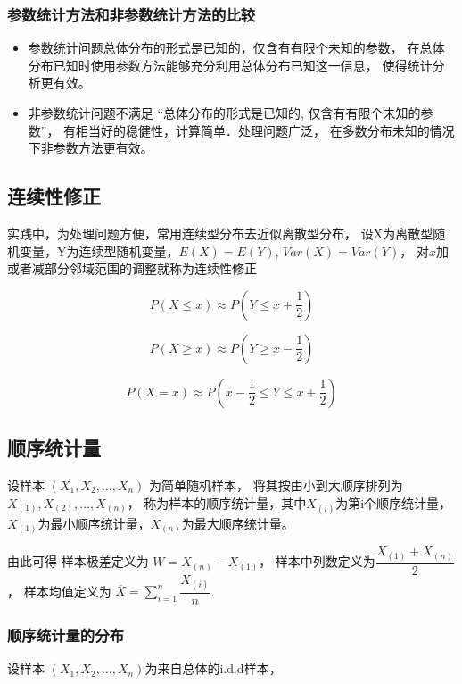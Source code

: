 \documentclass[UTF8]{ctexart}
\numberwithin{equation}{section}
\begin{document}
\subsubsection{参数统计方法和非参数统计方法的比较}
\begin{itemize}
    \item 参数统计问题总体分布的形式是已知的，仅含有有限个未知的参数，
    在总体分布已知时使用参数方法能够充分利用总体分布已知这一信息，
    使得统计分析更有效。
    \item 非参数统计问题不满足 “总体分布的形式是已知的, 仅含有有限个未知的参数”，
    有相当好的稳健性，计算简单．处理问题广泛，
    在多数分布未知的情况下非参数方法更有效。
\end{itemize}

\subsection{连续性修正}
实践中，为处理问题方便，常用连续型分布去近似离散型分布，
设X为离散型随机变量，Y为连续型随机变量，$E(X)=E(Y)$, $Var(X)=Var(Y)$，
对$x$加或者减部分邻域范围的调整就称为连续性修正

\begin{equation}
    P(X \leq x) \approx P(Y \leq x + \dfrac{1}{2})
\end{equation}

\begin{equation}
    P(X \geq x) \approx P(Y \geq x - \dfrac{1}{2})
\end{equation}

\begin{equation}
    P(X = x) \approx P(x - \dfrac{1}{2} \leq Y \leq x + \dfrac{1}{2})
\end{equation}

\subsection{顺序统计量}
设样本 $(X_1, X_2,\dots, X_n)$ 为简单随机样本，
将其按由小到大顺序排列为$X_{(1)}, X_{(2)}, \dots, X_{(n)}$，
称为样本的顺序统计量，其中$X_{(i)}$为第i个顺序统计量，
$X_{(1)}$为最小顺序统计量，$X_{(n)}$为最大顺序统计量。

由此可得
样本极差定义为 $W = X_{(n)} - X_{(1)}$，
样本中列数定义为$\dfrac{X_{(1)}+X_{(n)}}{2}$，
样本均值定义为 $\overline{X} = \sum_{i=1}^{n} \dfrac{X_{(i)}}{n}$.

\subsubsection{顺序统计量的分布}
设样本 $(X_1, X_2,\dots, X_n)$为来自总体的i.d.d样本，
\end{document}
